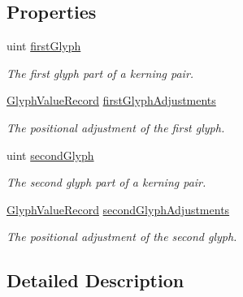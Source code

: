 \subsection*{Properties}
\begin{DoxyCompactItemize}
\item 
uint \mbox{\hyperlink{class_t_m_pro_1_1_kerning_pair_af9aa2a18d3992d1fa6080e44c69fe7c5}{first\+Glyph}}
\begin{DoxyCompactList}\small\item\em The first glyph part of a kerning pair. \end{DoxyCompactList}\item 
\mbox{\hyperlink{struct_t_m_pro_1_1_glyph_value_record}{Glyph\+Value\+Record}} \mbox{\hyperlink{class_t_m_pro_1_1_kerning_pair_a5eed997a7f25917e7de7804a6cf052f4}{first\+Glyph\+Adjustments}}
\begin{DoxyCompactList}\small\item\em The positional adjustment of the first glyph. \end{DoxyCompactList}\item 
uint \mbox{\hyperlink{class_t_m_pro_1_1_kerning_pair_a65feda26da1fd1a3fcdb1aa4ca681612}{second\+Glyph}}
\begin{DoxyCompactList}\small\item\em The second glyph part of a kerning pair. \end{DoxyCompactList}\item 
\mbox{\hyperlink{struct_t_m_pro_1_1_glyph_value_record}{Glyph\+Value\+Record}} \mbox{\hyperlink{class_t_m_pro_1_1_kerning_pair_a04339cd46e942ce4841397cb801c47d7}{second\+Glyph\+Adjustments}}
\begin{DoxyCompactList}\small\item\em The positional adjustment of the second glyph. \end{DoxyCompactList}\end{DoxyCompactItemize}


\subsection{Detailed Description}


